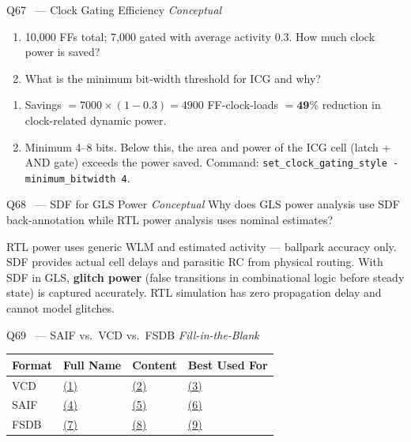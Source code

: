 \documentclass[12pt,a4paper]{article}
\newcommand{\advanced}{%
  \fbox{\textcolor{advred}{\bfseries\sffamily\small ADVANCED}}}
\newcommand{\moderate}{%
  \fbox{\textcolor{modoran}{\bfseries\sffamily\small MODERATE}}}
\begin{document}
\begin{questionbox}{Q67 \moderate\ --- Clock Gating Efficiency \hfill\textit{Conceptual}}
\begin{enumerate}[label=\textbf{\alph*)}]
  \item 10,000 FFs total; 7,000 gated with average activity 0.3. How much clock power is saved?
  \item What is the minimum bit-width threshold for ICG and why?
\end{enumerate}
\end{questionbox}

\begin{answerbox}
\begin{enumerate}[label=\textbf{\alph*)}]
  \item Savings $= 7000\times(1-0.3) = 4900$ FF-clock-loads $= \mathbf{49\%}$ reduction in clock-related dynamic power.
  \item Minimum 4--8 bits. Below this, the area and power of the ICG cell (latch + AND gate) exceeds the power saved. Command: \texttt{set\_clock\_gating\_style -minimum\_bitwidth 4}.
\end{enumerate}
\end{answerbox}

\begin{questionbox}{Q68 \advanced\ --- SDF for GLS Power \hfill\textit{Conceptual}}
Why does GLS power analysis use SDF back-annotation while RTL power analysis uses nominal estimates?
\end{questionbox}

\begin{answerbox}
RTL power uses generic WLM and estimated activity --- ballpark accuracy only. SDF provides actual cell delays and parasitic RC from physical routing. With SDF in GLS, \textbf{glitch power} (false transitions in combinational logic before steady state) is captured accurately. RTL simulation has zero propagation delay and cannot model glitches.
\end{answerbox}

\begin{questionbox}{Q69 \moderate\ --- SAIF vs.\ VCD vs.\ FSDB \hfill\textit{Fill-in-the-Blank}}

\begin{center}
\begin{tabularx}{\linewidth}{|l|X|X|X|}
\hline
\rowcolor{dkblue!15}
\textbf{Format} & \textbf{Full Name} & \textbf{Content} & \textbf{Best Used For}\\
\hline
VCD & \underline{(1)} & \underline{(2)} & \underline{(3)}\\
\hline
SAIF & \underline{(4)} & \underline{(5)} & \underline{(6)}\\
\hline
FSDB & \underline{(7)} & \underline{(8)} & \underline{(9)}\\
\hline
\end{tabularx}
\end{center}
\end{questionbox}
\end{document}
